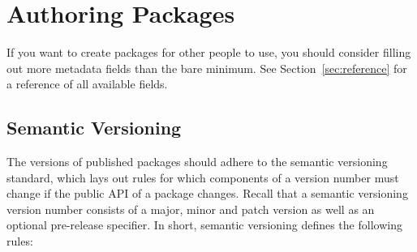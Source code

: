 \documentclass[11pt]{article}
\begin{document}
\clearpage

\section{Authoring Packages}

If you want to create packages for other people to use, you should consider 
filling out more metadata fields than the bare minimum. See 
Section~\ref{sec:reference} for a reference of all available fields.

\subsection{Semantic Versioning}
\label{sec:semantic-versioning}

The versions of published packages should adhere to the semantic versioning 
standard, which lays out rules for which components of a version number must
change if the public API of a package changes. Recall that a semantic versioning 
version number consists of a major, minor and patch version as well as an 
optional pre-release specifier. In short, semantic versioning defines the 
following rules:
\end{document}
